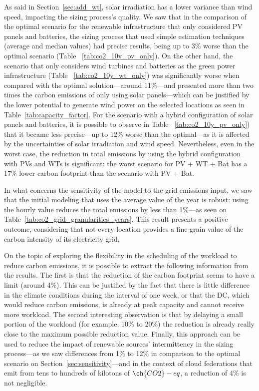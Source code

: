 
As said in Section~\ref{sec:add_wt}, solar irradiation has a lower variance than wind speed, impacting the sizing process's quality. We saw that in the comparison of the optimal scenario for the renewable infrastructure that only considered PV panels and batteries, the sizing process that used simple estimation techniques (average and median values) had precise results, being up to 3\% worse than the optimal scenario (Table ~\ref{tab:co2_10y_pv_only}). On the other hand, the scenario that only considers wind turbines and batteries as the green power infrastructure (Table ~\ref{tab:co2_10y_wt_only}) was significantly worse when compared with the optimal solution---around 11\%---and presented more than two times the carbon emissions of only using solar panels---which can be justified by the lower potential to generate wind power on the selected locations as seen in Table~\ref{tab:capacity_factor}. For the scenario with a hybrid configuration of solar panels and batteries, it is possible to observe in Table ~\ref{tab:co2_10y_pv_only}) that it became less precise---up to 12\% worse than the optimal---as it is affected by the uncertainties of solar irradiation and wind speed. Nevertheless, even in the worst case, the reduction in total  emissions by using the hybrid configuration with PVs and WTs is significant: the worst scenario for PV + WT + Bat has a 17\% lower carbon footprint than the scenario with PV + Bat.


In what concerns the sensitivity of the model to the grid emissions input, we saw that the initial modeling that uses the average value of the year is robust: using the hourly value reduces the total  emissions by less than 1\%---as seen on Table~\ref{tab:co2_grid_granularities_years}. This result presents a positive outcome, considering that not every location provides a fine-grain value of the carbon intensity of its electricity grid.

On the topic of exploring the flexibility in the scheduling of the workload to reduce carbon emissions, it is possible to extract the following information from the results. The first is that the reduction of the carbon footprint seems to have a limit (around 4\%). This can be justified by the fact that there is little difference in the climate conditions during the interval of one week, or that the DC, which would reduce carbon emissions, is already at peak capacity and cannot receive more workload. The second interesting observation is that by delaying a small portion of the workload (for example, 10\% to 20\%)  the reduction is already really close to the maximum possible reduction value. Finally, this approach can be used to reduce the impact of renewable sources' intermittency in the sizing process---as we saw differences from 1\% to 12\% in comparison to the optimal scenario on Section~\ref{sec:sensitivity}---and in the context of cloud federations that emit from tens to hundreds of kilotons of $\ch{CO2}-eq$, a reduction of 4\% is not negligible.

